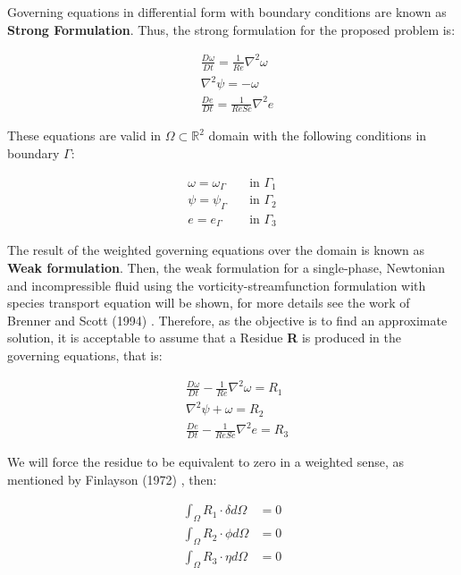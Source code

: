 Governing equations in differential form 
with boundary conditions are known as \textbf{Strong Formulation}. 
Thus, the strong formulation for the proposed problem is:

\begin{align}
& \frac{D \omega}{D t}
 =
 \frac{1}{Re} \nabla^{2} \omega
 \\[10pt] 
& \nabla^{2} \psi
 = 
 - 
 \omega \\[10pt]
& \frac{D e}{Dt}
 =
 \frac{1}{ReSc} \nabla^{2} e
\end{align}


\medskip
\noindent
These equations are valid in 
$\Omega \subset \mathbb{R}^2$ domain
with the following conditions in boundary $\Gamma$:

\begin{equation} \label{bc}
 \begin{aligned}
  \omega = \omega_\Gamma \quad & \mbox{in $\Gamma_1$}\\
  \psi = \psi_\Gamma \quad & \mbox{in $\Gamma_2$}\\
  e = e_\Gamma \quad & \mbox{in $\Gamma_3$}
\end{aligned}
\end{equation}

\vspace{1cm}
The result of the weighted governing equations over the domain 
is known as \textbf{Weak formulation}.
Then, the weak formulation 
for a single-phase, Newtonian and incompressible fluid using 
the vorticity-streamfunction formulation with species transport equation
will be shown, for more details see the work of Brenner and Scott (1994) 
\cite{brenner1994}. 
Therefore, as the objective is to find an approximate solution, 
it is acceptable to assume that a Residue \textbf{R} 
is produced in the governing equations, that is:


\begin{align}
& \frac{D \omega}{D t}
 -
 \frac{1}{Re} \nabla^{2} \omega
 = R_1 \\[10pt] 
& \nabla^{2} \psi
 + 
 \omega
 = R_2 \\[10pt]
& \frac{D e}{Dt}
 -
 \frac{1}{ReSc} \nabla^{2} e
 = R_3
\end{align}

\medskip
We will force the residue to be equivalent to zero 
in a weighted sense, as mentioned by Finlayson (1972) \cite{finlayson1972}, then:

\begin{align}
 \int_{\Omega} R_1 \cdot \delta d\Omega &= 0 \\
 \int_{\Omega} R_2 \cdot \phi d\Omega &= 0 \\
 \int_{\Omega} R_3 \cdot \eta d\Omega &= 0
\end{align}




